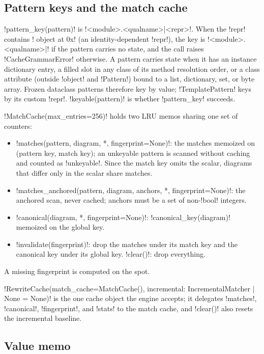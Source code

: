 \subsection{Pattern keys and the match cache}

\py!pattern_key(pattern)! is \code!<module>.<qualname>|<repr>!. When the \py!repr! contains
\code! object at 0x! (an identity-dependent \py!repr!), the key is \code!<module>.<qualname>|! if
the pattern carries no state, and the call raises \py!CacheGrammarError! otherwise. A pattern carries
state when it has an instance dictionary entry, a filled slot in any class of its method resolution
order, or a class attribute (outside \py!object! and \py!Pattern!) bound to a list, dictionary, set,
or byte array. Frozen dataclass patterns therefore key by value; \py!TemplatePattern! keys by its
custom \py!repr!. \py!keyable(pattern)! is whether \py!pattern_key! succeeds.

\py!MatchCache(max_entries=256)! holds two LRU memos sharing one set of counters:
\begin{itemize}
\item \py!matches(pattern, diagram, *, fingerprint=None)!: the matches memoized on
  (pattern key, match key); an unkeyable pattern is scanned without caching and counted as
  \py!unkeyable!. Since the match key omits the scalar, diagrams that differ only in the scalar share
  matches.
\item \py!matches_anchored(pattern, diagram, anchors, *, fingerprint=None)!: the anchored scan,
  never cached; anchors must be a set of non-\py!bool! integers.
\item \py!canonical(diagram, *, fingerprint=None)!: \py!canonical_key(diagram)! memoized on the
  global key.
\item \py!invalidate(fingerprint)!: drop the matches under its match key and the canonical key under
  its global key. \py!clear()!: drop everything.
\end{itemize}
A missing fingerprint is computed on the spot.

\py!RewriteCache(match_cache=MatchCache(), incremental: IncrementalMatcher | None = None)! is the
one cache object the engine accepts; it delegates \py!matches!, \py!canonical!, \py!fingerprint!,
and \py!stats! to the match cache, and \py!clear()! also resets the incremental baseline.

\subsection{Value memo}

